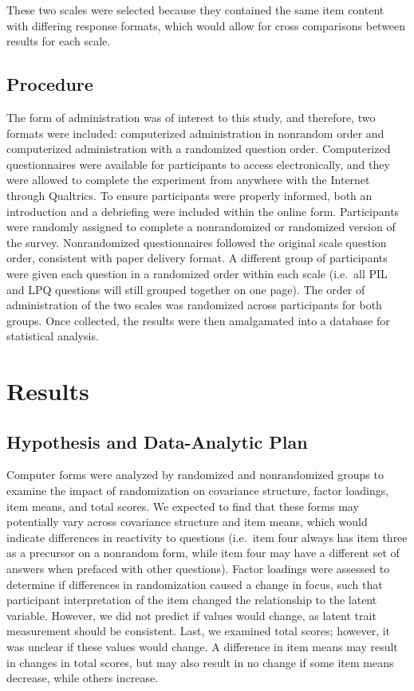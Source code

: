 \documentclass[english,man, mask]{apa6}
\theoremstyle{definition}
\theoremstyle{definition}
\theoremstyle{definition}
\theoremstyle{remark}
\begin{document}
These two scales were selected because they contained the same item
content with differing response formats, which would allow for cross
comparisons between results for each scale.

\subsection{Procedure}\label{procedure}

The form of administration was of interest to this study, and therefore,
two formats were included: computerized administration in nonrandom
order and computerized administration with a randomized question order.
Computerized questionnaires were available for participants to access
electronically, and they were allowed to complete the experiment from
anywhere with the Internet through Qualtrics. To ensure participants
were properly informed, both an introduction and a debriefing were
included within the online form. Participants were randomly assigned to
complete a nonrandomized or randomized version of the survey.
Nonrandomized questionnaires followed the original scale question order,
consistent with paper delivery format. A different group of participants
were given each question in a randomized order within each scale
(i.e.~all PIL and LPQ questions will still grouped together on one
page). The order of administration of the two scales was randomized
across participants for both groups. Once collected, the results were
then amalgamated into a database for statistical analysis.

\section{Results}\label{results}

\subsection{Hypothesis and Data-Analytic
Plan}\label{hypothesis-and-data-analytic-plan}

Computer forms were analyzed by randomized and nonrandomized groups to
examine the impact of randomization on covariance structure, factor
loadings, item means, and total scores. We expected to find that these
forms may potentially vary across covariance structure and item means,
which would indicate differences in reactivity to questions (i.e.~item
four always has item three as a precursor on a nonrandom form, while
item four may have a different set of answers when prefaced with other
questions). Factor loadings were assessed to determine if differences in
randomization caused a change in focus, such that participant
interpretation of the item changed the relationship to the latent
variable. However, we did not predict if values would change, as latent
trait measurement should be consistent. Last, we examined total scores;
however, it was unclear if these values would change. A difference in
item means may result in changes in total scores, but may also result in
no change if some item means decrease, while others increase.
\end{document}
